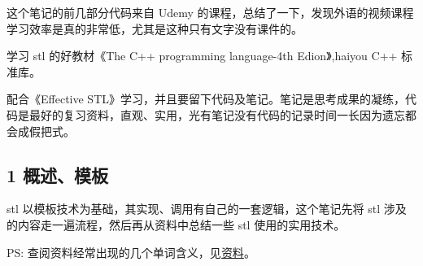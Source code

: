 这个笔记的前几部分代码来自 Udemy 的课程，总结了一下，发现外语的视频课程学习效率是真的非常低，尤其是这种只有文字没有课件的。

学习 stl 的好教材《\+The C++ programming language-\/4th Edion》,haiyou C++ 标准库。

配合《\+Effective S\+T\+L》学习，并且要留下代码及笔记。笔记是思考成果的凝练，代码是最好的复习资料，直观、实用，光有笔记没有代码的记录时间一长因为遗忘都会成假把式。

\subsection*{1 概述、模板}

stl 以模板技术为基础，其实现、调用有自己的一套逻辑，这个笔记先将 stl 涉及的内容走一遍流程，然后再从资料中总结一些 stl 使用的实用技术。

PS\+: 查阅资料经常出现的几个单词含义，见\mbox{\hyperlink{md_ch01_template__r_e_a_d_m_e}{资料}}。

